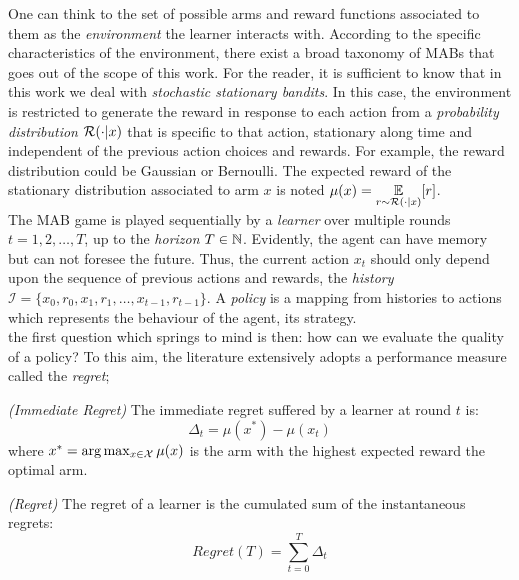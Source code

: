 One can think to the set of possible arms and reward functions associated to them as the \emph{environment} the learner interacts with. According to the specific characteristics of the environment, there exist a broad taxonomy of \gls{MAB}s that goes out of the scope of this work. For the reader, it is sufficient to know that in this work we deal with \emph{stochastic stationary bandits}. In this case, the environment is restricted to generate the reward in response to each action from a \emph{probability distribution} $\mathcal{R}(\cdot|x)$ that is specific to that action, stationary along time and independent of the previous action choices and rewards. For example, the reward distribution could be Gaussian or Bernoulli. The expected reward of the stationary distribution associated to arm $x$ is noted $\mu(x) = \underset{r\sim\mathcal{R}(\cdot|x)}{\mathbb{E}}[r]$. \\
The \gls{MAB} game is played sequentially by a \emph{learner} over multiple rounds $t=1, 2, \dots, T$, up to the \emph{horizon} $T\in\mathbb{N}$. Evidently, the agent can have memory but can not foresee the future. Thus, the current action $x_t$ should only depend upon the sequence of previous actions and rewards, the \emph{history} $\mathcal{I} = \{x_0, r_0, x_1, r_1, \dots, x_{t-1}, r_{t-1}\}$. A \emph{policy} is a mapping from histories to actions which represents the behaviour of the agent, its strategy. \\
the first question which springs to mind is then: how can we evaluate the quality of a policy? To this aim, the literature extensively adopts a performance measure called the \emph{regret};

\begin{definition}\label{def:immediateregret} \emph{(Immediate Regret)}
The immediate regret suffered by a learner at round $t$ is:
\begin{equation} 
\Delta_t = \mu(x^*) - \mu(x_t)
\end{equation}
where $x^* = \arg\max_{x\in\mathcal{X}}\mu(x)$ is the arm with the highest expected reward \ie the optimal arm.
\end{definition}
\begin{definition}\label{def:regret} \emph{(Regret)}
The regret of a learner is the cumulated sum of the instantaneous regrets:
\begin{equation}
Regret(T) = \sum_{t=0}^T\Delta_t
\end{equation}
\end{definition}

